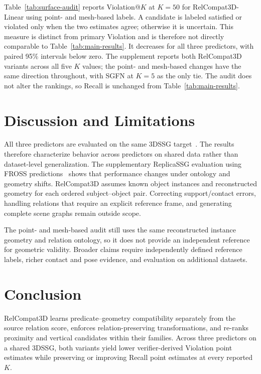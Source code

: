 \documentclass[letterpaper]{article}
\begin{document}
Table~\ref{tab:surface-audit} reports Violation@$K$ at $K=50$ for
RelCompat3D-Linear using point- and mesh-based labels. A candidate is labeled satisfied or violated only when the two estimates agree; otherwise it is uncertain. This measure is distinct from primary Violation and is therefore not directly comparable to Table~\ref{tab:main-results}. It decreases for all three predictors, with paired 95\% intervals below zero. The supplement reports both
RelCompat3D variants across all five $K$ values; the point- and mesh-based changes have the same direction throughout, with SGFN at $K=5$ as the only tie. The audit does not alter the rankings, so Recall is unchanged from Table~\ref{tab:main-results}.

\section{Discussion and Limitations}

All three predictors are evaluated on the same 3DSSG target~\cite{wald2020learning}. The results therefore characterize behavior across predictors on shared data rather than dataset-level generalization. The supplementary ReplicaSSG evaluation using FROSS predictions~\cite{hou2025fross} shows that performance changes under ontology and geometry shifts. RelCompat3D assumes known object instances and reconstructed geometry for each ordered subject--object pair. Correcting support/contact errors, handling relations that require an explicit reference frame, and generating complete scene graphs remain outside scope.

The point- and mesh-based audit still uses the same reconstructed instance geometry and relation ontology, so it does not provide an independent reference for geometric validity. Broader claims require independently defined reference labels, richer contact and pose evidence, and evaluation on additional datasets.

\section{Conclusion}
RelCompat3D learns predicate--geometry compatibility separately from the source relation score, enforces relation-preserving transformations, and re-ranks proximity and vertical candidates within their families. Across three predictors on a shared 3DSSG, both variants yield lower verifier-derived Violation point estimates while preserving or improving Recall point estimates at every reported $K$.


\end{document}
